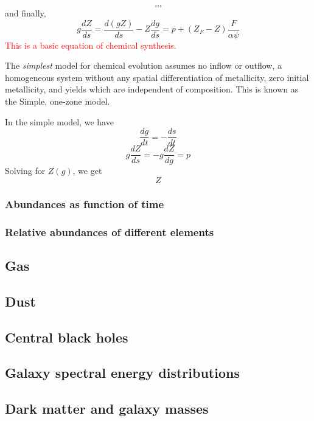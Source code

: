 \documentclass[12pt]{article}
\begin{document}
\begin{itemize*}
\begin{itemize*}
                $$ \ldots $$
                $$ \ldots $$
                and finally,
                $$ g\frac{dZ}{ds} = \frac{d(gZ)}{ds} - Z\frac{dg}{ds} =
                p + (Z_F - Z)\frac{F}{\alpha\psi} $$
                \textcolor{red}{This is a basic equation of chemical synthesis}.
            \item The \emph{simplest} model for chemical evolution assumes no
                inflow or outflow, a homogeneous system without any spatial
                differentiation of metallicity, zero initial metallicity, and
                yields which are independent of composition. This is known as the
                Simple, one-zone model.

                In the simple model, we have
                $$ \frac{dg}{dt} = -\frac{ds}{dt} $$
                $$ g\frac{dZ}{ds} = -g\frac{dZ}{dg} = p $$
                Solving for $Z(g)$, we get
                $$ Z
                $$
        \end{itemize*}
\end{itemize*}
\subsubsection*{Abundances as function of time}
\subsubsection*{Relative abundances of different elements}



\subsection*{Gas}
\subsection*{Dust}
\subsection*{Central black holes}
\subsection*{Galaxy spectral energy distributions}
\subsection*{Dark matter and galaxy masses}
\end{document}
